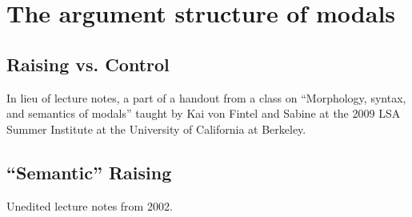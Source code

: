 \chapter{The argument structure of modals}
\label{chap:arg}
\setlength{\fboxrule}{2pt}


\minitoc

\section{Raising vs. Control}
\label{sec:raising-control}

In lieu of lecture notes, a part of a handout from a class on ``Morphology,
syntax, and semantics of modals'' taught by Kai von Fintel and Sabine at the 2009
LSA Summer Institute at the University of California at Berkeley.



\newpage
\section{``Semantic'' Raising}
\label{sec:semantic-raising}

Unedited lecture notes from 2002.







